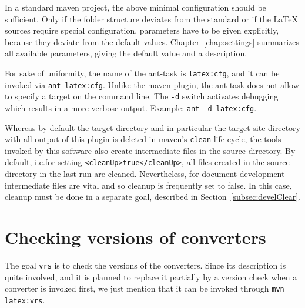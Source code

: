 % 



In a standard maven project, 
the above minimal configuration should be sufficient. 
Only if the folder structure deviates from the standard 
or if the \LaTeX{} sources require special configuration, 
parameters have to be given explicitly, 
because they deviate from the default values. 
Chapter~\ref{chap:settings} summarizes all available parameters, 
giving the default value and a description. 


For sake of uniformity, 
the name of the ant-task is \texttt{latex:cfg}, 
and it can be invoked via \texttt{ant latex:cfg}. 
Unlike the maven-plugin, the ant-task 
does not allow to specify a target on the command line. 
The \texttt{-d} switch activates debugging 
which results in a more verbose output. 
Example: \texttt{ant -d latex:cfg}. 

Whereas by default the target directory and in particular 
the target site directory with all output of this plugin is deleted 
in maven's \texttt{clean} life-cycle, 
the tools invoked by this software also create intermediate files 
in the source directory. 
By default, i.e.\@ for setting \texttt{<cleanUp>true</cleanUp>}, 
all files created in the source directory in the last run are cleaned. 
Nevertheless, for document development intermediate files are vital 
and so cleanup is frequently set to false. 
In this case, cleanup must be done in a separate goal, 
described in Section~\ref{subsec:develClear}. 



\section{Checking versions of converters}\label{sec:chkVersions}

The goal \texttt{vrs} is to check the versions of the converters. 
Since its description is quite involved, and it is planned 
to replace it partially by a version check when a converter is invoked first, 
we just mention that it can be invoked through \texttt{mvn latex:vrs}. 


